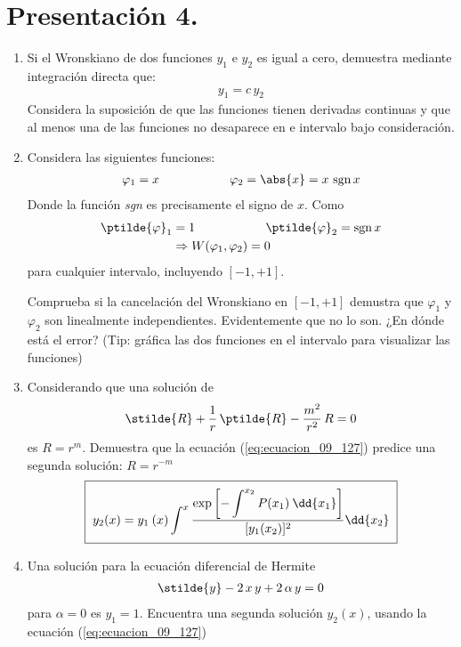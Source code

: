 \section{Presentación 4.}
\begin{enumerate}
\item Si el Wronskiano de dos funciones $y_{1}$ e $y_{2}$ es igual a cero, demuestra mediante integración directa que:
\begin{align*}
y_{1} = c \, y_{2}
\end{align*}
Considera la suposición de que las funciones tienen derivadas continuas y que al menos una de las funciones no desaparece en e intervalo bajo consideración.
\item Considera las siguientes funciones:
\begin{align*}
\varphi_{1} =  x \hspace{2cm} \varphi_{2} = \abs{x} = x \, \, \mbox{sgn} \, x
\end{align*}
Donde la función \textit{sgn} es precisamente el signo de $x$. Como 
\begin{align*}
\ptilde{\varphi}_{1} &=  1 \hspace{2cm} \ptilde{\varphi}_{2} = \mbox{sgn} \, x \\
&\Rightarrow W(\varphi_{1}, \varphi_{2}) = 0
\end{align*}
para cualquier intervalo, incluyendo $[-1, +1]$.
\par
Comprueba si la cancelación del Wronskiano en $[-1, +1]$ demustra que $\varphi_{1}$ y $\varphi_{2}$ son linealmente independientes. Evidentemente que no lo son. ¿En dónde está el error? (Tip: gráfica las dos funciones en el intervalo para visualizar las funciones)
\item Considerando que una solución de
\begin{align*}
\stilde{R} + \dfrac{1}{r} \, \ptilde{R} - \dfrac{m^{2}}{r^{2}} \, R = 0
\end{align*}
es $R = r^{m}$. Demuestra que la ecuación (\ref{eq:ecuacion_09_127}) predice una segunda solución: $R = r^{-m}$
\begin{align}
\setlength{\fboxsep}{2\fboxsep}\boxed{y_{2}(x) =  y_{1} \: (x) \int^{x} \dfrac{\exp \left[ \displaystyle - \int^{x_{2}} P(x_{1}) \: \dd{x_{1}} \right]}{[y_{1}(x_{2})]^{2}} \dd{x_{2}}}
\label{eq:ecuacion_09_127}
\end{align}
\item Una solución para la ecuación diferencial de Hermite
\begin{align*}
\stilde{y} - 2 \, x \, y + 2 \, \alpha \, y = 0
\end{align*}
para $\alpha = 0$ es $y_{1} = 1$. Encuentra una segunda solución $y_{2}(x)$, usando la ecuación (\ref{eq:ecuacion_09_127})
\end{enumerate}
